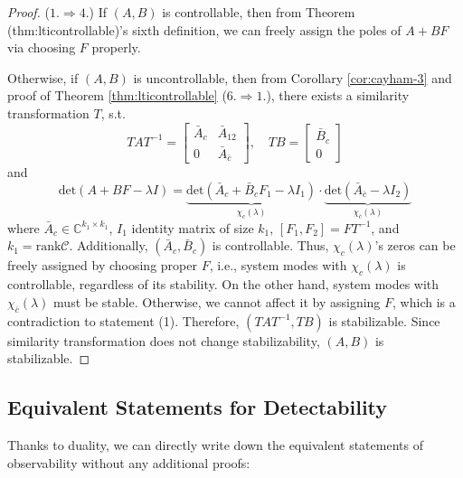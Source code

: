 \documentclass[
]{book}
\theoremstyle{definition}
\theoremstyle{definition}
\theoremstyle{definition}
\theoremstyle{definition}
\theoremstyle{remark}
\begin{document}
\begin{proof}
(\(1. \Rightarrow 4.\)) If \((A,B)\) is controllable, then from Theorem (thm:lticontrollable)'s sixth definition, we can freely assign the poles of \(A+BF\) via choosing \(F\) properly.

Otherwise, if \((A,B)\) is uncontrollable, then from Corollary \ref{cor:cayham-3} and proof of Theorem \ref{thm:lticontrollable} (\(6. \Rightarrow 1.\)), there exists a similarity transformation \(T\), s.t.
\begin{equation*}
   TAT^{-1} = \begin{bmatrix}
      \bar{A}_c & \bar{A}_{12} \\
      0 & \bar{A}_{\bar{c}}
   \end{bmatrix}, \quad TB = \begin{bmatrix}
      \bar{B}_c \\
      0
   \end{bmatrix}
\end{equation*}
and
\begin{equation*}
   \text{det}(A+BF-\lambda I) = \underbrace{\text{det}(\bar{A}_c + \bar{B}_c F_1 - \lambda I_1)}_{\chi_c(\lambda)} \cdot 
   \underbrace{\text{det}(\bar{A}_{\bar{c}} - \lambda I_2)}_{\chi_{\bar{c}}(\lambda)}
\end{equation*}
where \(\bar{A}_c \in \mathbb{C}^{k_1 \times k_1}\), \(I_1\) identity matrix of size \(k_1\), \([F_1,F_2] = FT^{-1}\), and \(k_1 = \text{rank} \mathcal{C}\). Additionally, \((\bar{A}_c, \bar{B}_c)\) is controllable. Thus, \(\chi_c(\lambda)\)'s zeros can be freely assigned by choosing proper \(F\), i.e., system modes with \(\chi_c(\lambda)\) is controllable, regardless of its stability. On the other hand, system modes with \(\chi_{\bar{c}}(\lambda)\) must be stable. Otherwise, we cannot affect it by assigning \(F\), which is a contradiction to statement (1). Therefore, \((TAT^{-1}, TB)\) is stabilizable. Since similarity transformation does not change stabilizability, \((A,B)\) is stabilizable.
\end{proof}

\hypertarget{equivalent-statements-for-detectability}{%
\subsection{Equivalent Statements for Detectability}\label{equivalent-statements-for-detectability}}

Thanks to duality, we can directly write down the equivalent statements of observability without any additional proofs:
\end{document}
